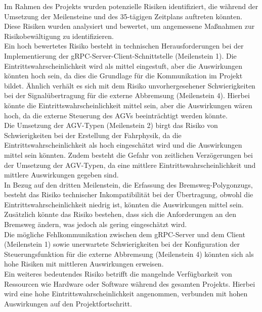 Im Rahmen des Projekts wurden potenzielle Risiken identifiziert, die während der Umsetzung der Meilensteine und des 35-tägigen Zeitplans auftreten könnten. Diese Risiken wurden analysiert und bewertet, um angemessene Maßnahmen zur Risikobewältigung zu identifizieren.\\

Ein hoch bewertetes Risiko besteht in technischen Herausforderungen bei der Implementierung der gRPC-Server-Client-Schnittstelle (Meilenstein 1). Die Eintrittswahrscheinlichkeit wird als mittel eingestuft, aber die Auswirkungen könnten hoch sein, da dies die Grundlage für die Kommunikation im Projekt bildet. Ähnlich verhält es sich mit dem Risiko unvorhergesehener Schwierigkeiten bei der Signalübertragung für die externe Abbremsung (Meilenstein 4). Hierbei könnte die Eintrittswahrscheinlichkeit mittel sein, aber die Auswirkungen wären hoch, da die externe Steuerung des AGVs beeinträchtigt werden könnte.\\

Die Umsetzung der AGV-Typen (Meilenstein 2) birgt das Risiko von Schwierigkeiten bei der Erstellung der Fahrphysik, da die Eintrittswahrscheinlichkeit als hoch eingeschätzt wird und die Auswirkungen mittel sein könnten. Zudem besteht die Gefahr von zeitlichen Verzögerungen bei der Umsetzung der AGV-Typen, da eine mittlere Eintrittswahrscheinlichkeit und mittlere Auswirkungen gegeben sind.\\

In Bezug auf den dritten Meilenstein, die Erfassung des Bremsweg-Polygonzugs, besteht das Risiko technischer Inkompatibilität bei der Übertragung, obwohl die Eintrittswahrscheinlichkeit niedrig ist, könnten die Auswirkungen mittel sein. Zusätzlich könnte das Risiko bestehen, dass sich die Anforderungen an den Bremsweg ändern, was jedoch als gering eingeschätzt wird.\\

Die mögliche Fehlkommunikation zwischen dem gRPC-Server und dem Client (Meilenstein 1) sowie unerwartete Schwierigkeiten bei der Konfiguration der Steuerungsfunktion für die externe Abbremsung (Meilenstein 4) könnten sich als hohe Risiken mit mittleren Auswirkungen erweisen.\\

Ein weiteres bedeutendes Risiko betrifft die mangelnde Verfügbarkeit von Ressourcen wie Hardware oder Software während des gesamten Projekts. Hierbei wird eine hohe Eintrittswahrscheinlichkeit angenommen, verbunden mit hohen Auswirkungen auf den Projektfortschritt.\\

